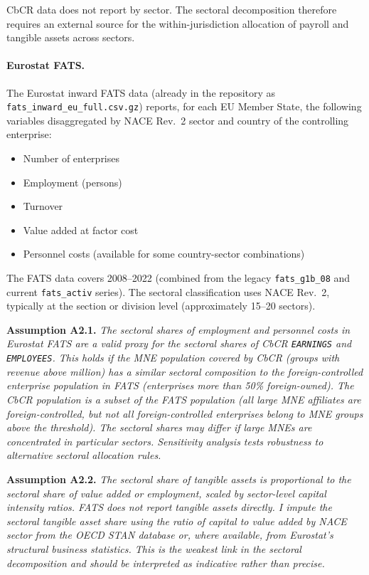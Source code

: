 \documentclass[11pt,a4paper]{article}
\newcommand{\EUR}{\texteuro}
\newcommand{\code}[1]{\texttt{#1}}
\newcommand{\assumption}[2]{\noindent\textbf{Assumption #1.} \textit{#2}\medskip}
\begin{document}
CbCR data does not report by sector. The sectoral decomposition therefore requires an external source for the within-jurisdiction allocation of payroll and tangible assets across sectors.

\paragraph{Eurostat FATS.} The Eurostat inward FATS data (already in the repository as \code{fats\_inward\_eu\_full.csv.gz}) reports, for each EU Member State, the following variables disaggregated by NACE Rev.~2 sector and country of the controlling enterprise:

\begin{itemize}
\item Number of enterprises
\item Employment (persons)
\item Turnover
\item Value added at factor cost
\item Personnel costs (available for some country-sector combinations)
\end{itemize}

The FATS data covers 2008--2022 (combined from the legacy \code{fats\_g1b\_08} and current \code{fats\_activ} series). The sectoral classification uses NACE Rev.~2, typically at the section or division level (approximately 15--20 sectors).

\assumption{A2.1}{The sectoral shares of employment and personnel costs in Eurostat FATS are a valid proxy for the sectoral shares of CbCR \code{EARNINGS} and \code{EMPLOYEES}. This holds if the MNE population covered by CbCR (groups with revenue above \EUR750 million) has a similar sectoral composition to the foreign-controlled enterprise population in FATS (enterprises more than 50\% foreign-owned). The CbCR population is a subset of the FATS population (all large MNE affiliates are foreign-controlled, but not all foreign-controlled enterprises belong to MNE groups above the threshold). The sectoral shares may differ if large MNEs are concentrated in particular sectors. Sensitivity analysis tests robustness to alternative sectoral allocation rules.}

\assumption{A2.2}{The sectoral share of tangible assets is proportional to the sectoral share of value added or employment, scaled by sector-level capital intensity ratios. FATS does not report tangible assets directly. I impute the sectoral tangible asset share using the ratio of capital to value added by NACE sector from the OECD STAN database or, where available, from Eurostat's structural business statistics. This is the weakest link in the sectoral decomposition and should be interpreted as indicative rather than precise.}
\end{document}
